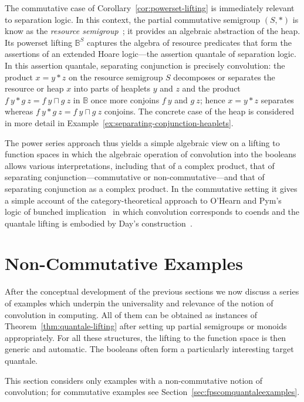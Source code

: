 \documentclass[12pt]{article}
\theoremstyle{definition}
\newcommand{\refthm}[1]{Theorem~\ref{#1}}
\begin{document}
The commutative case of Corollary~\ref{cor:powerset-lifting} is
immediately relevant to separation logic. In this context, the partial
commutative semigroup $(S,\ast)$ is know as the \emph{resource
  semigroup}~\cite{COY07}; it provides an algebraic abstraction of the
heap. Its powerset lifting $\mathbb{B}^S$ captures the algebra of
resource predicates that form the assertions of an extended Hoare
logic---the assertion quantale of separation logic.  In this assertion
quantale, separating conjunction is precisely convolution: the product
$x=y\ast z$ on the resource semigroup $S$ decomposes or separates the
resource or heap $x$ into parts of heaplets $y$ and $z$ and the
product $f\ y\ast g\ z=f\ y\sqcap g\ z$ in $\mathbb{B}$ once more
conjoins $f\ y$ and $g\ z$; hence $x=y\ast z$ separates whereas $f\
y\ast g\ z=f\ y\sqcap g\ z$ conjoins.  The concrete case of the heap
is considered in more detail in
Example~\ref{ex:separating-conjunction-heaplets}.

The power series approach thus yields a simple algebraic view on a
lifting to function spaces in which the algebraic operation of
convolution into the booleans allows various interpretations,
including that of a complex product, that of separating
conjunction---commutative or non-commutative---and that of separating
conjunction as a complex product. In the commutative setting it gives
a simple account of the category-theoretical approach to O'Hearn and
Pym's logic of bunched implication~\cite{OHearnP99} in which
convolution corresponds to coends and the quantale lifting is embodied
by Day's construction~\cite{Day}.



\section{Non-Commutative Examples}\label{sec:fpsquantaleexamples}

After the conceptual development of the previous sections we now
discuss a series of examples which underpin the universality and
relevance of the notion of convolution in computing. All of them can
be obtained as instances of \refthm{thm:quantale-lifting} after
setting up partial semigroups or monoids appropriately. For all these
structures, the lifting to the function space is then generic and
automatic. The booleans often form a particularly interesting target
quantale.

This section considers only examples with a non-commutative notion of
convolution; for commutative examples see Section~\ref{sec:fpscomquantaleexamples}.
\end{document}
